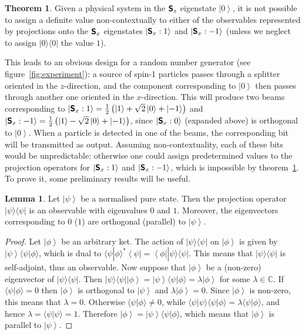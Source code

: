 \documentclass[11pt, a4paper]{article}
\theoremstyle{definition}
\newtheorem{theorem}[Theorem]{Theorem}
\newtheorem{lemma}[Theorem]{Lemma}
\newcommand{\bra}[1]{\left< #1 \right|}
\newcommand{\ket}[1]{\left| #1 \right>}
\newcommand{\iprod}[2]{\langle #1 | #2 \rangle}
\newcommand{\oprod}[2]{| #1 \rangle\langle #2 |}
\begin{document}
\begin{theorem}
\label{thm:main}
Given a physical system in the $\textsf{\textbf{S}}_z$ eigenstate $\ket{0}$, it is not possible to assign a definite value non-contextually to either of the observables represented by projections onto the $\textsf{\textbf{S}}_x$ eigenstates $\ket{\textsf{\textbf{S}}_x : 1}$ and $\ket{\textsf{\textbf{S}}_x : -1}$ (unless we neglect to assign $\oprod{0}{0}$ the value $1$).
\end{theorem}
This leads to an obvious design for a random number generator (see figure~\ref{fig:experiment}): a source of spin-1 particles passes through a splitter oriented in the $z$-direction, and the component corresponding to $\ket{0}$ then passes through another one oriented in the $x$-direction.
This will produce two beams corresponding to $\ket{\textsf{\textbf{S}}_x : 1} = \frac{1}{2} \left( \ket{1} + \sqrt{2} \ket{0} + \ket{-1} \right)$ and $\ket{\textsf{\textbf{S}}_x : -1} = \frac{1}{2} \left( \ket{1} - \sqrt{2} \ket{0} + \ket{-1} \right)$, since $\ket{\textsf{\textbf{S}}_x : 0}$ (expanded above) is orthogonal to $\ket{0}$.
When a particle is detected in one of the beams, the corresponding bit will be transmitted as output.
Assuming non-contextuality, each of these bits would be unpredictable: otherwise one could assign predetermined values to the projection operators for $\ket{\textsf{\textbf{S}}_x : 1}$ and $\ket{\textsf{\textbf{S}}_x : -1}$, which is impossible by theorem~\ref{thm:main}.
To prove it, some preliminary results will be useful.
\\
\begin{lemma}
\label{lem:spectrum}
Let $\ket{\psi}$ be a normalised pure state.
Then the projection operator $\oprod{\psi}{\psi}$ is an observable with eigenvalues $0$ and $1$.
Moreover, the eigenvectors corresponding to $0$ ($1$) are orthogonal (parallel) to $\ket{\psi}$.
\end{lemma}
\begin{proof}
Let $\ket{\phi}$ be an arbitrary ket.
The action of $\oprod{\psi}{\psi}$ on $\ket{\phi}$ is given by $\ket{\psi} \iprod{\psi}{\phi}$, which is dual to $\iprod{\psi}{\phi}^* \bra{\psi} = \bra{\phi} \oprod{\psi}{\psi}$.
This means that $\oprod{\psi}{\psi}$ is self-adjoint, thus an observable.
Now suppose that $\ket{\phi}$ be a (non-zero) eigenvector of $\oprod{\psi}{\psi}$.
Then $\oprod{\psi}{\psi} \ket{\phi} = \ket{\psi} \iprod{\psi}{\phi} = \lambda \ket{\phi}$ for some $\lambda \in \mathbb{C}$.
If $\iprod{\psi}{\phi} = 0$ then $\ket{\phi}$ is orthogonal to $\ket{\psi}$ and $\lambda \ket{\phi} = 0$.
Since $\ket{\phi}$ is non-zero, this means that $\lambda = 0$.
Otherwise $\iprod{\psi}{\phi} \neq 0$, while $\iprod{\psi}{\psi} \iprod{\psi}{\phi} = \lambda \iprod{\psi}{\phi}$, and hence $\lambda = \iprod{\psi}{\psi} = 1$.
Therefore $\ket{\phi} = \ket{\psi} \iprod{\psi}{\phi}$, which means that $\ket{\phi}$ is parallel to $\ket{\psi}$.
\end{proof}
\end{document}
